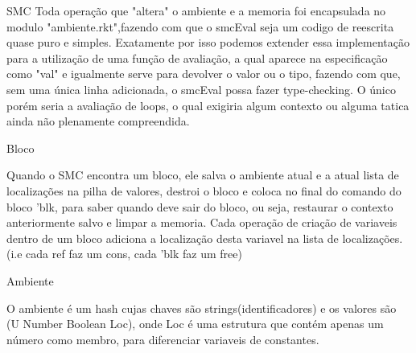 \documentclass{beamer}
\begin{document}
\begin{frame}{SMC}
Toda operação que "altera" o ambiente e a memoria foi encapsulada no modulo "ambiente.rkt",fazendo com que o smcEval seja um codigo de reescrita quase puro e simples.
Exatamente por isso podemos extender essa implementação para a utilização de uma função de avaliação, a qual aparece na especificação como "val" e igualmente serve
para devolver o valor ou o tipo, fazendo com que, sem uma única linha adicionada, o smcEval possa fazer type-checking. O único porém seria a avaliação de loops, o qual
exigiria algum contexto ou alguma tatica ainda não plenamente compreendida.
\end{frame}

\begin{frame}{Bloco}

Quando o SMC encontra um bloco, ele salva o ambiente atual e a atual lista de localizações na pilha de valores, destroi o bloco e coloca no final do comando do bloco
'blk, para saber quando deve sair do bloco, ou seja, restaurar o contexto anteriormente salvo e limpar a memoria. Cada operação de criação de variaveis dentro de um
bloco adiciona a localização desta variavel na lista de localizações. (i.e cada ref faz um cons, cada 'blk faz um free)
\end{frame}


\begin{frame}{Ambiente}

O ambiente é um hash cujas chaves são strings(identificadores) e os valores são (U Number Boolean Loc), onde Loc é uma estrutura que contém apenas um número como membro,
para diferenciar variaveis de constantes.

\end{frame}
\end{document}
